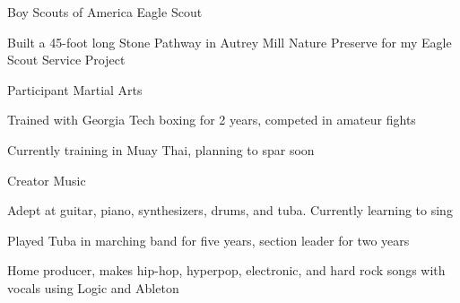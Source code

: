 \documentclass[11pt, a4paper]{awesome-cv}
\begin{document}
\makecvheader[C]









\begin{cventries}
\cventry
    {Boy Scouts of America} %
    {Eagle Scout} %
    {\;} %
    {} %
    {
      \begin{cvitems} %
        \item {Built a 45-foot long Stone Pathway in Autrey Mill Nature Preserve for my Eagle Scout Service Project}
      \end{cvitems}
    }
\end{cventries}

\begin{cventries}
\cventry
  {Participant} %
  {Martial Arts} %
  {} %
  {} %
  {
    \begin{cvitems} %
      \item {Trained with Georgia Tech boxing for 2 years, competed in amateur fights}
      \item {Currently training in Muay Thai, planning to spar soon}
    \end{cvitems}
  }
  \cventry
  {Creator} %
  {Music} %
  {} %
  {} %
  {
    \begin{cvitems} %
      \item {Adept at guitar, piano, synthesizers, drums, and tuba. Currently learning to sing}
      \item {Played Tuba in marching band for five years, section leader for two years}
      \item {Home producer, makes hip-hop, hyperpop, electronic, and hard rock songs with vocals using Logic and Ableton}
    \end{cvitems}
  }
\end{cventries}

\end{document}
